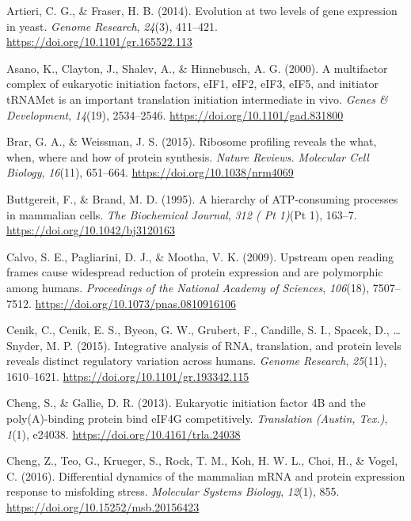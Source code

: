 \documentclass[12pt,openany]{book}
\begin{document}
\hypertarget{ref-Artieri2014}{}
Artieri, C. G., \& Fraser, H. B. (2014). Evolution at two levels of gene
expression in yeast. \emph{Genome Research}, \emph{24}(3), 411--421.
\url{https://doi.org/10.1101/gr.165522.113}

\hypertarget{ref-Asano2000}{}
Asano, K., Clayton, J., Shalev, A., \& Hinnebusch, A. G. (2000). A
multifactor complex of eukaryotic initiation factors, eIF1, eIF2, eIF3,
eIF5, and initiator tRNAMet is an important translation initiation
intermediate in vivo. \emph{Genes \& Development}, \emph{14}(19),
2534--2546. \url{https://doi.org/10.1101/gad.831800}

\hypertarget{ref-Brar2015}{}
Brar, G. A., \& Weissman, J. S. (2015). Ribosome profiling reveals the
what, when, where and how of protein synthesis. \emph{Nature Reviews.
Molecular Cell Biology}, \emph{16}(11), 651--664.
\url{https://doi.org/10.1038/nrm4069}

\hypertarget{ref-Buttgereit1995}{}
Buttgereit, F., \& Brand, M. D. (1995). A hierarchy of ATP-consuming
processes in mammalian cells. \emph{The Biochemical Journal}, \emph{312
( Pt 1)}(Pt 1), 163--7. \url{https://doi.org/10.1042/bj3120163}

\hypertarget{ref-Calvo2009}{}
Calvo, S. E., Pagliarini, D. J., \& Mootha, V. K. (2009). Upstream open
reading frames cause widespread reduction of protein expression and are
polymorphic among humans. \emph{Proceedings of the National Academy of
Sciences}, \emph{106}(18), 7507--7512.
\url{https://doi.org/10.1073/pnas.0810916106}

\hypertarget{ref-Cenik2015}{}
Cenik, C., Cenik, E. S., Byeon, G. W., Grubert, F., Candille, S. I.,
Spacek, D., \ldots{} Snyder, M. P. (2015). Integrative analysis of RNA,
translation, and protein levels reveals distinct regulatory variation
across humans. \emph{Genome Research}, \emph{25}(11), 1610--1621.
\url{https://doi.org/10.1101/gr.193342.115}

\hypertarget{ref-Cheng2013}{}
Cheng, S., \& Gallie, D. R. (2013). Eukaryotic initiation factor 4B and
the poly(A)-binding protein bind eIF4G competitively. \emph{Translation
(Austin, Tex.)}, \emph{1}(1), e24038.
\url{https://doi.org/10.4161/trla.24038}

\hypertarget{ref-Cheng2016}{}
Cheng, Z., Teo, G., Krueger, S., Rock, T. M., Koh, H. W. L., Choi, H.,
\& Vogel, C. (2016). Differential dynamics of the mammalian mRNA and
protein expression response to misfolding stress. \emph{Molecular
Systems Biology}, \emph{12}(1), 855.
\url{https://doi.org/10.15252/msb.20156423}
\end{document}
